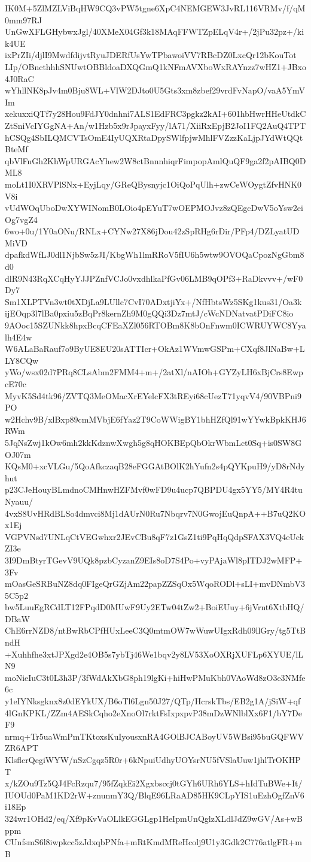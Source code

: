 IK0M+5ZlMZLViBqHW9CQ3vPW5tgne6XpC4NEMGEW3JvRL116VRMv/f/qM0mm97RJ
UnGwXFLGHybwxJgl/40XMeX04Gf3k18MAqFFWTZpELqV4r+/2jPu32pz+/kik4UE
ixPrZIi/djlI9MwdfdijvtRyuJDERfUsYwTPbawoiVV7RBcDZ0LxcQr12bKouTot
LIp/OBncthhhSNUwtOBBldoaDXQGmQ1kNFmAVXboWxRAYnzz7wHZ1+JBxo4J0RaC
wYhllNK8pJv4m0Bju8WL+VlW2DJto0U5Gts3xm8zbef29vrdFvNapO/vaA5YmVIm
xekuxxiQTf7y28Hou9FdJY0dnhni7ALS1EdFRC3pgkz2kAI+601hbHwrHHeUtdkC
ZtSniVcIYGgNA+An/w1Hzb5x9rJpayxFyy/lA71/XiiRxEpjB2JoI1FQ2AuQ4TPT
hCSQg4SbILQMCVTsOmE4IyUQXRtaDpySWlfpjwMhlFVZzzKaLjpJYdWtQQtBteMf
qbVlFnGh2KhWpURGAcYhew2W8ctBnnnhiqrFimpopAmlQuQF9ga2f2pAIBQ0DML8
moLt1I0XRVPlSNx+EyjLqy/GReQBysnyjc1OiQoPqUlh+zwCeWOygtZfvHNK0V8i
vUdWOqUboDwXYWINomB0LOio4pEYuT7wOEPMOJvz8zQEgcDwV5oYsw2eiOg7vgZ4
6wo+0u/1Y0aONu/RNLx+CYNw27X86jDou42zSpRHg6rDir/PFp4/DZLyatUDMiVD
dpafkdWfLJ0dl1NjbSw5zJI/KbgWh1lmRRoV5fIU6h5wtw9OVOQaCpozNgGbm8d0
dlR9N43RqXCqHyYJJPZnfVCJo0vxdhlkaPfGv06LMB9qOPf3+RaDkvvv+/wF0Dy7
Sm1XLPTVn3wt0tXDjLa9LUllc7CvI70ADxtjiYx+/NfHbtsWz5SKg1kus31/Oa3k
ijEOqp3l7lBa0pxiu5zBqPr8kernZh9M0gQQi3Dz7mtJ/cWcNDNatvatPDiFC8io
9AOoc15SZUNkk8hpxBcqCFEaXZl056RTOBm8K8bOnFnwm0ICWRUYWC8Yyalh4E4w
W6ALaBaRauf7o9ByUE8EU20sATTIcr+OkAz1WVmwGSPm+CXqf8JlNaBw+LLY8CQw
yWo/wsx02d7PRq8CLsAbm2FMM4+m+/2atXl/nAIOh+GYZyLH6xBjCrs8EwpcE70c
MyvK5Sd4tk96/ZVTQ3MeOMacXrEYelcFX3tREyi68cUezT71yqvV4/90VBPni9PO
w2Hchv9B/xlBxp89cmMVbjE6fYaz2T9CoWWigBY1bhHZfQl91wYYwkBpkKHJ6RWm
5JqNsZwj1kOw6mh2kkKdznwXwgh5g8qHOKBEpQbOkrWbmLct0Sq+is0SW8GOJ07m
KQsM0+xcVLGu/5QoAfkczaqB28eFGGAtBOlK2hYufn2s4pQYKpuH9/yD8rNdyhut
p23CJeHouyBLmdnoCMHnwHZFMvf0wFD9u4ucp7QBPDU4gx5YY5/MY4R4tuNyauu/
4vxS8UvHRdBLSo4dmvci8Mj1dAUrN0Ru7Nbqrv7N0GwojEuQnpA++B7uQ2KOx1Ej
VGPVNsd7UNLqCtVEGwhxr2JEvCBu8qF7z1GsZ1ti9PqHqQdpSFAX3VQ4eUckZI3e
3I9DmBtyrTGevV9UQk8pzbCyzanZ9EIs8oD7S4Po+vyPAjaWl8pITDJ2wMFP+3Fv
mOasGeSRBuNZ8dq0FIgeQrGZjAm22papZZSqOx5WqoRODl+sLI+mvDNmbV35C5p2
bw5LuuEgRCdLT12FPqdD0MUwF9Uy2ETw04tZw2+BoiEUuy+6jVrnt6XtbHQ/DBaW
ChE6rrNZD8/ntBwRbCPfHUxLeeC3Q0mtmOW7wWuwUIgxRdh09llGry/tg5TtBndH
+Xuhhfhe3xtJPXgd2e4OB5s7ybTj46We1bqv2y8LV53XoOXRjXUFLp6XYUE/lLN9
moNieIuC3t0L3h3P/3fWdAkXbG8ph19lgKi+hiHwPMuKbh0VAoWd8zO3e3NMfe6c
y1eIYNksgknx8z0dEYkUX/B6oTl6Lgn50J27/QTp/HcrskTbs/EB2g1A/jSiW+qf
4lGnKPKL/ZZm4AESkCqho2eXnoOl7rktFsIxpxpvP38mDzWNlblXx6F1/bY7DeF9
nrmq+Tr5uaWmPmTKtoxsKuIyousxnRA4GOlBJCABoyUV5WBsi95buGQFWVZR6APT
KlsflcrQegiWYW/nSzCgqz5R0r+6kNpuiUdhyUOYsrNU5fVSlaUuw1jhlTrOKHPT
x/kZOu9Tz5QJ4FcRzqu7/95fZqkEi2Xgxbsccj0tGYh6URh6YLS+hIdTuBWe+It/
IUOUd0PaM1KD2rW+znunmY3Q/BlqE96LRaAD85HK9CLpYIS1uEzhOgfZnV6i18Ep
324wr1OHd2/eq/Xf9pKvVaOLlkEGGLgp1HeIpmUnQglzXLdlJdZ9wGV/As+wBppm
CUnfsmS6l8iwpkcc5zJdxqbPNfa+mRtKmdMReHcolj9U1y3Gdk2C776atlgFR+mB
